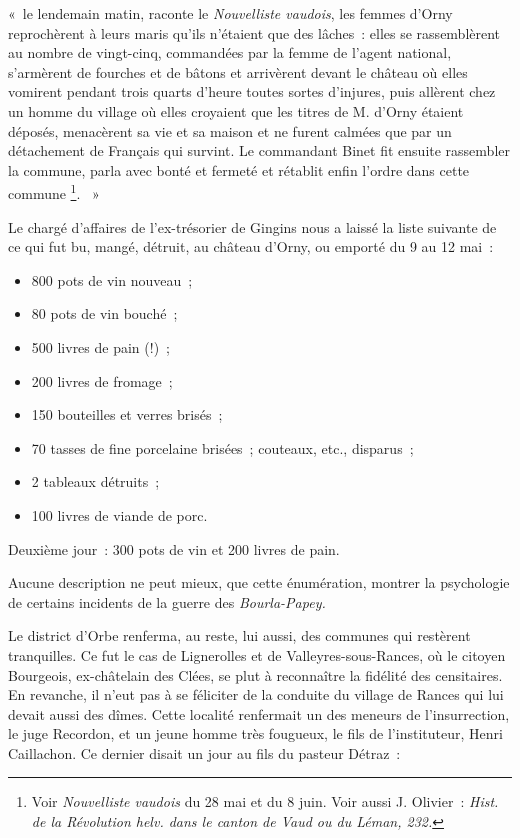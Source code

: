 \documentclass[french,twoside]{book} %
\newenvironment{quoteblock}%
  {\begin{quoting}}
  {\end{quoting}}
\newenvironment{quotebar}{%
    \def\FrameCommand{{\color{rubric!10!}\vrule width 0.5em} \hspace{0.9em}}%
    \def\OuterFrameSep{\itemsep} %
    \MakeFramed {\advance\hsize-\width \FrameRestore}
  }%
  {%
    \endMakeFramed
  }
\renewenvironment{quoteblock}%
  {%
    \savenotes
    \setstretch{0.9}
    \normalfont
    \begin{quotebar}
  }
  {%
    \end{quotebar}
    \spewnotes
  }
\begin{document}
\begin{quoteblock}
\noindent « le lendemain matin, raconte le \emph{Nouvelliste vaudois}, les femmes d’Orny reprochèrent à leurs maris qu’ils n’étaient que des lâches : elles se rassemblèrent au nombre de vingt-cinq, commandées par la femme de l’agent national, s’armèrent de fourches et de bâtons et arrivèrent devant le château où elles vomirent pendant trois quarts d’heure toutes sortes d’injures, puis allèrent chez un homme du village où elles croyaient que les titres de M. d’Orny étaient déposés, menacèrent sa vie et sa maison et ne furent calmées que par un détachement de Français qui survint. Le commandant Binet fit ensuite rassembler la commune, parla avec bonté et fermeté et rétablit enfin l’ordre dans cette commune \footnote{Voir \emph{Nouvelliste vaudois} du 28 mai et du 8 juin. Voir aussi J. Olivier : \emph{Hist. de la Révolution helv. dans le canton de Vaud ou du Léman, 232.}}.  »\end{quoteblock}

\noindent Le chargé d’affaires de l’ex-trésorier de Gingins nous a laissé la liste suivante de ce qui fut bu, mangé, détruit, au château d’Orny, ou emporté du 9 au 12 mai :\par

\begin{itemize}[itemsep=0pt,]
\item 800 pots de vin nouveau ;
\item 80 pots de vin bouché ;
\item 500 livres de pain (!) ;
\item 200 livres de fromage ;
\item 150 bouteilles et verres brisés ;
\item 70 tasses de fine porcelaine brisées ; couteaux, etc., disparus ;
\item 2 tableaux détruits ;
\item 100 livres de viande de porc.
\end{itemize}

\noindent Deuxième jour : 300 pots de vin et 200 livres de pain.\par
Aucune description ne peut mieux, que cette énumération, montrer la psychologie de certains incidents de la guerre des \emph{Bourla-Papey.}\par
Le district d’Orbe renferma, au reste, lui aussi, des communes qui restèrent tranquilles. Ce fut le cas de Lignerolles et de Valleyres-sous-Rances, où le citoyen Bourgeois, ex-châtelain des Clées, se plut à reconnaître la fidélité des censitaires. En revanche, il n’eut pas à se féliciter de la conduite du village de Rances qui lui devait aussi des dîmes. Cette localité renfermait un des meneurs de l’insurrection, le juge Recordon, et un jeune homme très fougueux, le fils de l’instituteur, Henri Caillachon. Ce dernier disait un jour au fils du pasteur Détraz :\par
\end{document}
